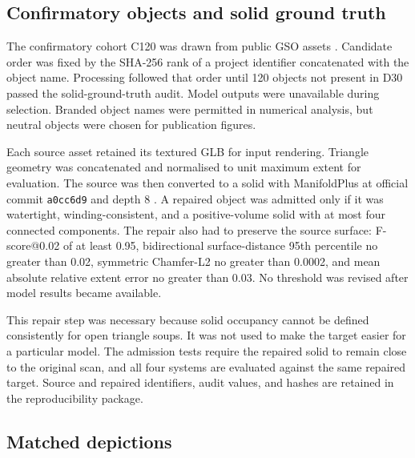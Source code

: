 \documentclass[12pt,a4paper]{article}
\begin{document}
\subsection{Confirmatory objects and solid ground truth}

The confirmatory cohort C120 was drawn from public GSO assets \parencite{downs2022gso}. Candidate order was fixed by the SHA-256 rank of a project identifier concatenated with the object name. Processing followed that order until 120 objects not present in D30 passed the solid-ground-truth audit. Model outputs were unavailable during selection. Branded object names were permitted in numerical analysis, but neutral objects were chosen for publication figures.

Each source asset retained its textured GLB for input rendering. Triangle geometry was concatenated and normalised to unit maximum extent for evaluation. The source was then converted to a solid with ManifoldPlus at official commit \texttt{a0cc6d9} and depth 8 \parencite{huang2020manifoldplus}. A repaired object was admitted only if it was watertight, winding-consistent, and a positive-volume solid with at most four connected components. The repair also had to preserve the source surface: F-score@0.02 of at least 0.95, bidirectional surface-distance 95th percentile no greater than 0.02, symmetric Chamfer-L2 no greater than 0.0002, and mean absolute relative extent error no greater than 0.03. No threshold was revised after model results became available.

This repair step was necessary because solid occupancy cannot be defined consistently for open triangle soups. It was not used to make the target easier for a particular model. The admission tests require the repaired solid to remain close to the original scan, and all four systems are evaluated against the same repaired target. Source and repaired identifiers, audit values, and hashes are retained in the reproducibility package.

\subsection{Matched depictions}
\end{document}
